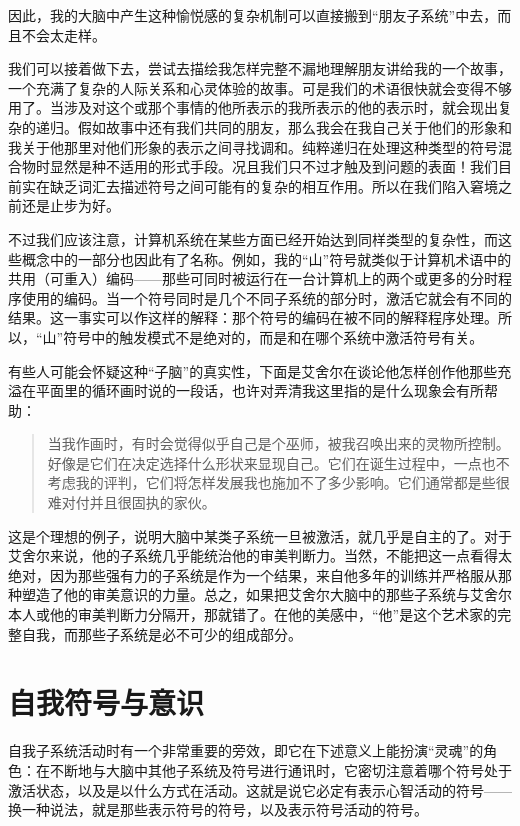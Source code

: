 因此，我的大脑中产生这种愉悦感的复杂机制可以直接搬到“朋友子系统”中去，而且不会太走样。

我们可以接着做下去，尝试去描绘我怎样完整不漏地理解朋友讲给我的一个故事，一个充满了复杂的人际关系和心灵体验的故事。可是我们的术语很快就会变得不够用了。当涉及对这个或那个事情的他所表示的我所表示的他的表示时，就会现出复杂的递归。假如故事中还有我们共同的朋友，那么我会在我自己关于他们的形象和我关于他那里对他们形象的表示之间寻找调和。纯粹递归在处理这种类型的符号混合物时显然是种不适用的形式手段。况且我们只不过才触及到问题的表面！我们目前实在缺乏词汇去描述符号之间可能有的复杂的相互作用。所以在我们陷入窘境之前还是止步为好。

不过我们应该注意，计算机系统在某些方面已经开始达到同样类型的复杂性，而这些概念中的一部分也因此有了名称。例如，我的“山”符号就类似于计算机术语中的共用（可重入）编码——那些可同时被运行在一台计算机上的两个或更多的分时程序使用的编码。当一个符号同时是几个不同子系统的部分时，激活它就会有不同的结果。这一事实可以作这样的解释：那个符号的编码在被不同的解释程序处理。所以，“山”符号中的触发模式不是绝对的，而是和在哪个系统中激活符号有关。

有些人可能会怀疑这种“子脑”的真实性，下面是艾舍尔在谈论他怎样创作他那些充溢在平面里的循环画时说的一段话，也许对弄清我这里指的是什么现象会有所帮助：

\begin{quote}
当我作画时，有时会觉得似乎自己是个巫师，被我召唤出来的灵物所控制。好像是它们在决定选择什么形状来显现自己。它们在诞生过程中，一点也不考虑我的评判，它们将怎样发展我也施加不了多少影响。它们通常都是些很难对付并且很固执的家伙。
\end{quote}

这是个理想的例子，说明大脑中某类子系统一旦被激活，就几乎是自主的了。对于艾舍尔来说，他的子系统几乎能统治他的审美判断力。当然，不能把这一点看得太绝对，因为那些强有力的子系统是作为一个结果，来自他多年的训练并严格服从那种塑造了他的审美意识的力量。总之，如果把艾舍尔大脑中的那些子系统与艾舍尔本人或他的审美判断力分隔开，那就错了。在他的美感中，“他”是这个艺术家的完整自我，而那些子系统是必不可少的组成部分。

\section{自我符号与意识}

自我子系统活动时有一个非常重要的旁效，即它在下述意义上能扮演“灵魂”的角色：在不断地与大脑中其他子系统及符号进行通讯时，它密切注意着哪个符号处于激活状态，以及是以什么方式在活动。这就是说它必定有表示心智活动的符号——换一种说法，就是那些表示符号的符号，以及表示符号活动的符号。

